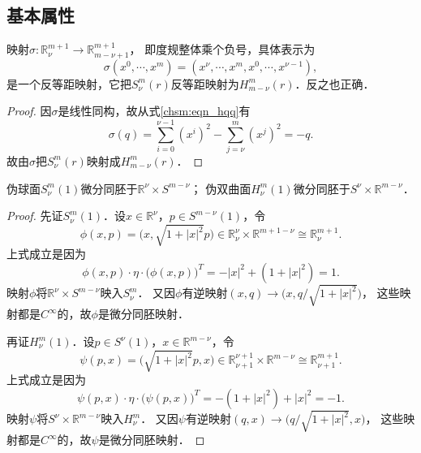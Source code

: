 \subsection{基本属性}
\begin{proposition}\label{chsm:thm_ReqH}
    映射$\sigma:\mathbb{R}^{m+1}_{\nu} \to \mathbb{R}^{m+1}_{m-\nu+1}$，
    即度规整体乘个负号，具体表示为
    \begin{equation}
        \sigma(x^0,\cdots,x^{m}) = (x^{\nu},\cdots, x^{m},x^0,\cdots,x^{\nu-1}) ,
    \end{equation}
    是一个{\kaishu 反等距}映射，它把$S^m_{\nu}(r)$反等距映射为$H^m_{m-\nu}(r)$．反之也正确．    
\end{proposition}
\begin{proof}
    因$\sigma$是线性同构，故从式\eqref{chsm:eqn_hqq}有
    \begin{equation}
        \sigma(q)= \sum_{i=0}^{\nu-1} (x^i)^2 - \sum_{j=\nu}^{m} (x^j)^2 
        =- q .
    \end{equation}
    故由$\sigma$把$S^m_{\nu}(r)$映射成$H^m_{m-\nu}(r)$．
\end{proof}


\begin{proposition}
    伪球面$S^m_{\nu}(1)$微分同胚于$\mathbb{R}^\nu \times S^{m-\nu}$；
    伪双曲面$H^m_{\nu}(1)$微分同胚于$S^\nu \times \mathbb{R}^{m-\nu}$．
\end{proposition}
\begin{proof}
    先证$S^m_\nu(1)$．设$x\in \mathbb{R}^\nu$，$p\in S^{m-\nu}(1)$，令
    \begin{equation}
        \phi(x,p)=\bigl(x,\sqrt{1+|x|^2} p\bigr) \in \mathbb{R}^\nu_\nu \times \mathbb{R}^{m+1-\nu}
        \cong \mathbb{R}^{m+1}_\nu .
    \end{equation}
    上式成立是因为
    \begin{equation}
        \phi(x,p) \cdot \eta \cdot \bigl(\phi(x,p)\bigr)^T = -|x|^2 + (1+|x|^2) = 1.
    \end{equation}
    映射$\phi$将$\mathbb{R}^\nu \times S^{m-\nu}$映入$S^m_\nu$．
    又因$\phi$有逆映射$(x,q)\to\bigl(x,q/\sqrt{1+|x|^2} \bigr) $，
    这些映射都是$C^\infty$的，故$\phi$是微分同胚映射．
    
    再证$H^m_\nu(1)$．设$p\in S^{\nu}(1)$，$x\in \mathbb{R}^{m-\nu}$，令
    \begin{equation}
        \psi(p,x)=\bigl(\sqrt{1+|x|^2} p, x \bigr) \in 
        \mathbb{R}^{\nu+1}_{\nu+1} \times \mathbb{R}^{m-\nu}
        \cong \mathbb{R}^{m+1}_{\nu+1} .
    \end{equation}
    上式成立是因为
    \begin{equation}
        \psi(p,x) \cdot \eta \cdot \bigl(\psi(p,x)\bigr)^T = - (1+|x|^2) + |x|^2 = -1.
    \end{equation}
    映射$\psi$将$S^{\nu}\times \mathbb{R}^{m-\nu}$映入$H^m_\nu$．
    又因$\psi$有逆映射$(q,x)\to\bigl(q/\sqrt{1+|x|^2},x \bigr) $，
    这些映射都是$C^\infty$的，故$\psi$是微分同胚映射．
\end{proof}


